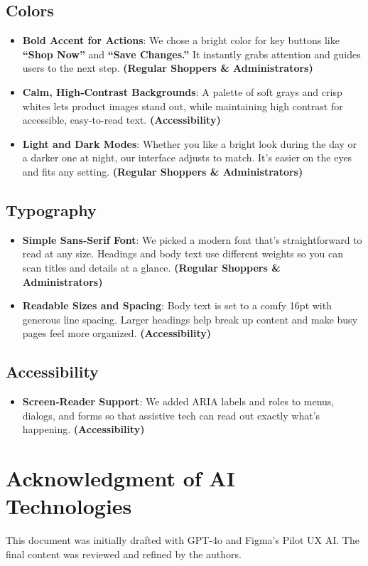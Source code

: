\documentclass[12pt]{article}
\begin{document}
	\subsection{Colors}\label{subsec:colors}

	\begin{itemize}
	\item \textbf{Bold Accent for Actions}: We chose a bright color for key buttons like \textbf{“Shop Now”} and \textbf{“Save Changes.”} It instantly grabs attention and guides users to the next step. \textbf{(Regular Shoppers \& Administrators)}
	\item \textbf{Calm, High‑Contrast Backgrounds}: A palette of soft grays and crisp whites lets product images stand out, while maintaining high contrast for accessible, easy-to-read text. \textbf{(Accessibility)}
	\item \textbf{Light and Dark Modes}: Whether you like a bright look during the day or a darker one at night, our interface adjusts to match. It’s easier on the eyes and fits any setting. \textbf{(Regular Shoppers \& Administrators)}
	\end{itemize}

	\subsection{Typography}\label{subsec:typography}

	\begin{itemize}
	\item \textbf{Simple Sans‑Serif Font}: We picked a modern font that’s straightforward to read at any size. Headings and body text use different weights so you can scan titles and details at a glance. \textbf{(Regular Shoppers \& Administrators)}
	\item \textbf{Readable Sizes and Spacing}: Body text is set to a comfy 16pt with generous line spacing. Larger headings help break up content and make busy pages feel more organized. \textbf{(Accessibility)}
	\end{itemize}

	\subsection{Accessibility}\label{subsec:accessibility}

	\begin{itemize}
	\item \textbf{Screen‑Reader Support}: We added ARIA labels and roles to menus, dialogs, and forms so that assistive tech can read out exactly what’s happening. \textbf{(Accessibility)}
	\end{itemize}

	\section{Acknowledgment of AI Technologies}\label{sec:acknowledgment-of-ai-technologies}

	This document was initially drafted with GPT-4o and Figma's Pilot UX AI. The final content was reviewed and refined by the authors.
\end{document}
